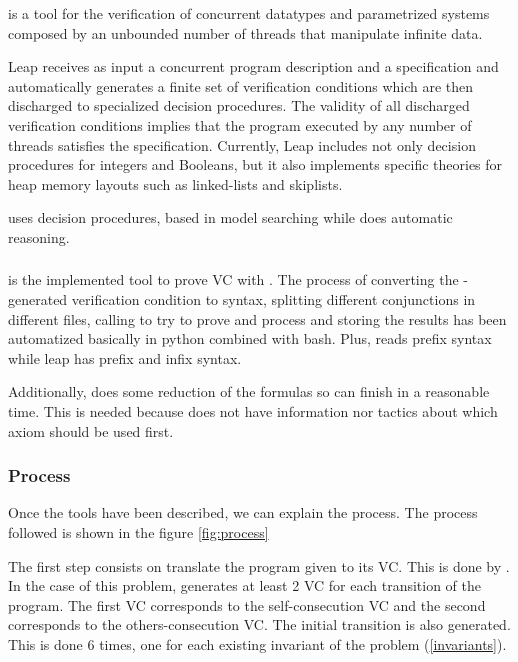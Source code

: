 \leap is a tool for the verification of concurrent datatypes and parametrized systems composed by an unbounded number of threads that manipulate infinite data.

Leap receives as input a concurrent program description and a specification and automatically generates a finite set of verification conditions which are then discharged to specialized decision procedures. 
%
The validity of all discharged verification conditions implies that the program executed by any number of threads satisfies the specification. 
%
Currently, Leap includes not only decision procedures for integers and Booleans, but it also implements specific theories for heap memory layouts such as linked-lists and skiplists.

\leap uses decision procedures, based in model searching while \spass does automatic reasoning. 



\subsubsection{\gandalf}

\gandalf is the implemented tool to prove \gls{VC} with \spass. 
%
The process of converting the \leap-generated verification condition to \spass syntax, splitting different conjunctions in different files, calling \spass to try to prove and process and storing the results has been automatized basically in python combined with bash.
Plus, \spass reads prefix syntax while leap has prefix and infix syntax.

Additionally, \gandalf does some reduction of the formulas so \spass can finish in a reasonable time.
%
This is needed because \spass does not have information nor tactics about which axiom should be used first.



\subsubsection{Process}

Once the tools have been described, we can explain the process. 
%
The process followed is shown in the figure \ref{fig:process}


The first step consists on translate the program given to its \gls{VC}. 
%
This is done by \leap. 
%
In the case of this problem, \leap generates at least 2 \gls{VC} for each transition of the program. 
%
The first \gls{VC} corresponds to the self-consecution \gls{VC} and the second corresponds to the others-consecution \gls{VC}. The initial transition is also generated.
%
This is done 6 times, one for each existing invariant of the problem (\ref{invariants}).

